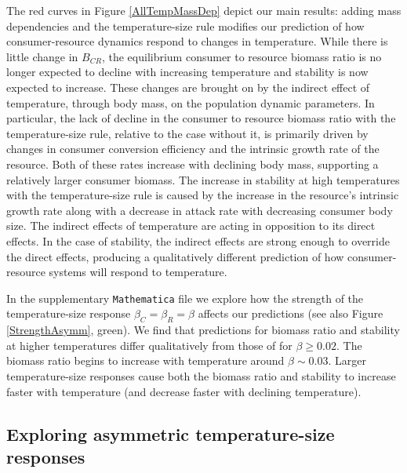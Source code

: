 \documentclass[11pt]{article}
\begin{document}
The red curves in Figure \ref{AllTempMassDep} depict our main results: adding mass dependencies and the temperature-size rule modifies our prediction of how consumer-resource dynamics respond to changes in temperature.
While there is little change in $B_{CR}$, the equilibrium consumer to resource biomass ratio is no longer expected to decline with increasing temperature and stability is now expected to increase.
These changes are brought on by the indirect effect of temperature, through body mass, on the population dynamic parameters.
In particular, the lack of decline in the consumer to resource biomass ratio with the temperature-size rule, relative to the case without it, is primarily driven by changes in consumer conversion efficiency and the intrinsic growth rate of the resource.
Both of these rates increase with declining body mass, supporting a relatively larger consumer biomass. 
The increase in stability at high temperatures with the temperature-size rule is caused by the increase in the resource's intrinsic growth rate along with a decrease in attack rate with decreasing consumer body size. 
%
%
The indirect effects of temperature are acting in opposition to its direct effects.
In the case of stability, the indirect effects are strong enough to override the direct effects, producing a qualitatively different prediction of how consumer-resource systems will respond to temperature.

In the supplementary \texttt{Mathematica} file we explore how the strength of the temperature-size response $\beta_C = \beta_R = \beta$ affects our predictions (see also Figure \ref{StrengthAsymm}, green). 
We find that predictions for biomass ratio and stability at higher temperatures differ qualitatively from those of \cite{Gilbert2014} for $\beta\geq0.02$.
The biomass ratio begins to increase with temperature around $\beta\sim0.03$.
Larger temperature-size responses cause both the biomass ratio and stability to increase faster with temperature (and decrease faster with declining temperature).

\subsection*{Exploring asymmetric temperature-size responses}
\end{document}
